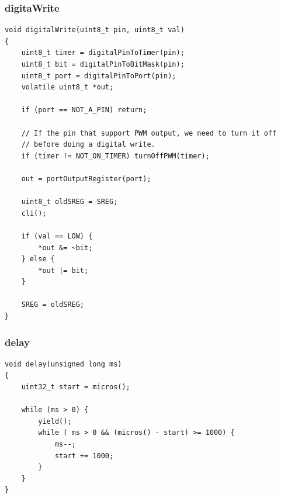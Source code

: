 \subsubsection{digitaWrite}

\begin{lstlisting}
void digitalWrite(uint8_t pin, uint8_t val)
{
	uint8_t timer = digitalPinToTimer(pin);
	uint8_t bit = digitalPinToBitMask(pin);
	uint8_t port = digitalPinToPort(pin);
	volatile uint8_t *out;

	if (port == NOT_A_PIN) return;

	// If the pin that support PWM output, we need to turn it off
	// before doing a digital write.
	if (timer != NOT_ON_TIMER) turnOffPWM(timer);

	out = portOutputRegister(port);

	uint8_t oldSREG = SREG;
	cli();

	if (val == LOW) {
		*out &= ~bit;
	} else {
		*out |= bit;
	}

	SREG = oldSREG;
}
\end{lstlisting}

\subsubsection{delay}

\begin{lstlisting}
void delay(unsigned long ms)
{
	uint32_t start = micros();

	while (ms > 0) {
		yield();
		while ( ms > 0 && (micros() - start) >= 1000) {
			ms--;
			start += 1000;
		}
	}
}
\end{lstlisting}